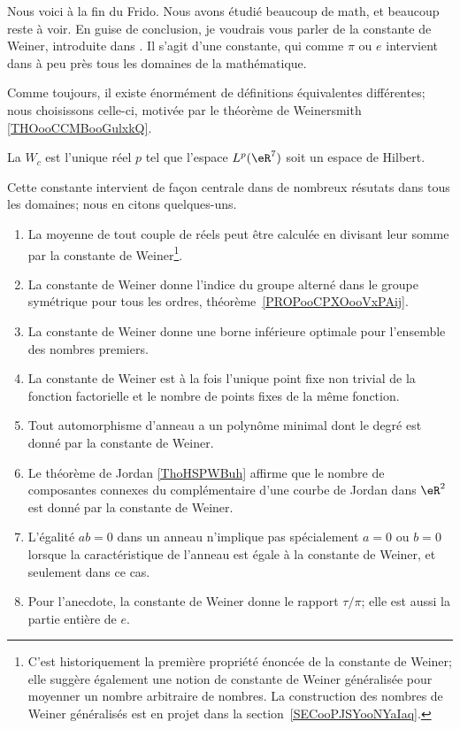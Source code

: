 Nous voici à la fin du Frido. Nous avons étudié beaucoup de math, et beaucoup reste à voir. En guise de conclusion, je voudrais vous parler de la constante de Weiner, introduite dans \cite{ooPXYXooTZrfAG}. Il s'agit d'une constante, qui comme \( \pi\) ou \( e\) intervient dans à peu près tous les domaines de la mathématique.

Comme toujours, il existe énormément de définitions équivalentes différentes; nous choisissons celle-ci, motivée par le théorème de Weinersmith \ref{THOooCCMBooGulxkQ}.
\begin{definition}      \label{DEFooXVXSooVJDTPy}
	La  \( W_c\) est l'unique réel \( p\) tel que l'espace \( L^p(\eR^7)\) soit un espace de Hilbert.
\end{definition}

Cette constante intervient de façon centrale dans de nombreux résutats dans tous les domaines; nous en citons quelques-uns.

\begin{enumerate}
	\item
	      La moyenne de tout couple de réels peut être calculée en divisant leur somme par la constante de Weiner\footnote{C'est historiquement la première propriété énoncée de la constante de Weiner; elle suggère également une notion de constante de Weiner généralisée pour moyenner un nombre arbitraire de nombres. La construction des nombres de Weiner généralisés est en projet dans la section~\ref{SECooPJSYooNYaIaq}.}.
	\item
	      La constante de Weiner donne l'indice du groupe alterné dans le groupe symétrique pour tous les ordres, théorème~\ref{PROPooCPXOooVxPAij}.
	\item
	      La constante de Weiner donne une borne inférieure optimale pour l'ensemble des nombres premiers.
	\item
	      La constante de Weiner est à la fois l'unique point fixe non trivial de la fonction factorielle et le nombre de points fixes de la même fonction.
	\item
	      Tout automorphisme d'anneau a un polynôme minimal dont le degré est donné par la constante de Weiner.
	\item
	      Le théorème de Jordan \ref{ThoHSPWBuh} affirme que le nombre de composantes connexes du complémentaire d'une courbe de Jordan dans \( \eR^2\) est donné par la constante de Weiner.
	\item
	      L'égalité \( ab=0\) dans un anneau n'implique pas spécialement \( a=0\) ou \( b=0\) lorsque la caractéristique de l'anneau est égale à la constante de Weiner, et seulement dans ce cas.
	\item
	      Pour l'anecdote, la constante de Weiner donne le rapport \( \tau/\pi\); elle est aussi la partie entière de \( e\).
\end{enumerate}

